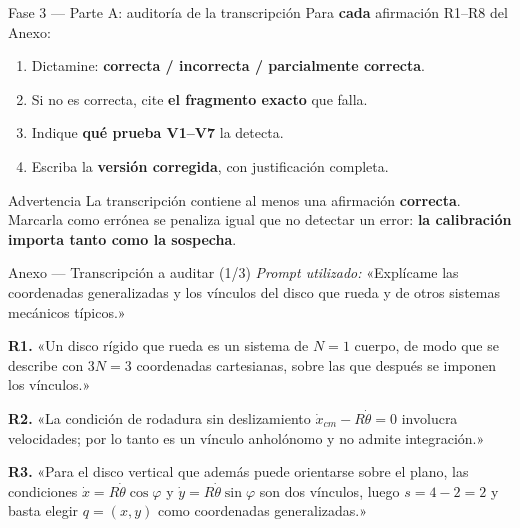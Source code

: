 \documentclass[10pt,aspectratio=169]{beamer}
\begin{document}
\begin{frame}{Fase 3 --- Parte A: auditoría de la transcripción}
  Para \textbf{cada} afirmación R1--R8 del Anexo:
  \begin{enumerate}
    \item Dictamine: \textbf{correcta / incorrecta / parcialmente correcta}.
    \item Si no es correcta, cite \textbf{el fragmento exacto} que falla.
    \item Indique \textbf{qué prueba V1--V7} la detecta.
    \item Escriba la \textbf{versión corregida}, con justificación completa.
  \end{enumerate}
  \pause
  \begin{alertblock}{Advertencia}
    La transcripción contiene al menos una afirmación \textbf{correcta}. Marcarla como errónea se penaliza igual que no detectar un error: \textbf{la calibración importa tanto como la sospecha}.
  \end{alertblock}
\end{frame}

\begin{frame}{Anexo --- Transcripción a auditar (1/3)}
  \small
  \textit{Prompt utilizado:} «Explícame las coordenadas generalizadas y los vínculos del disco que rueda y de otros sistemas mecánicos típicos.»
  \vspace{0.6em}

  \textbf{R1.} «Un disco rígido que rueda es un sistema de $N=1$ cuerpo, de modo que se describe con $3N=3$ coordenadas cartesianas, sobre las que después se imponen los vínculos.»
  \vspace{0.4em}

  \textbf{R2.} «La condición de rodadura sin deslizamiento $\dot x_{cm}-R\dot\theta=0$ involucra velocidades; por lo tanto es un vínculo anholónomo y no admite integración.»
  \vspace{0.4em}

  \textbf{R3.} «Para el disco vertical que además puede orientarse sobre el plano, las condiciones $\dot x=R\dot\theta\cos\varphi$ y $\dot y=R\dot\theta\sin\varphi$ son dos vínculos, luego $s=4-2=2$ y basta elegir $q=(x,y)$ como coordenadas generalizadas.»
\end{frame}
\end{document}
